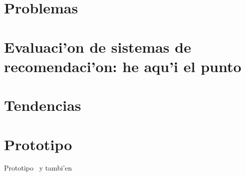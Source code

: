 \documentclass[11pt]{article}
\begin{document}
\section{Problemas}

\section{Evaluaci'on de sistemas de recomendaci'on: he aqu'i el punto}

\section{Tendencias}

\section{Prototipo}
Prototipo~\cite{rep1:isra} y tambi'en~\cite{rep2:isra}





\end{document}

